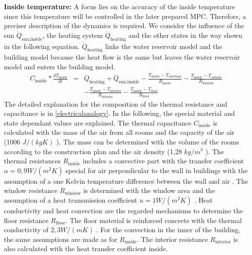     \textbf{Inside temperature:}\newline
    A focus lies on the accuracy of the inside temperature since this temperature will be controlled in the later prepared MPC. Therefore, a preciser description of the dynamics is required. We consider the influence of the sun $\dot{Q}_\text{sun,inside}$, the heating system $\dot{Q}_\text{heating}$ and the other states in the way shown in the following equation. $\dot{Q}_\text{heating}$  links the water reservoir model and the building model because the heat flow is the same but leaves the water reservoir model and enters the building model. 
    \begin{align}
        \label{eq:1.state}
        C_\text{inside}*\frac{d T_\text{inside}}{d t} &=& \dot{Q}_\text{heating} + \dot{Q}_\text{sun,inside} - \frac{T_\text{inside}-T_\text{envelope}}{R_\text{inside}} - \frac{T_\text{inside}-T_\text{outside}}{R_\text{window}} \\
       & &-\frac{T_\text{inside}-T_\text{interior}}{R_\text{interior}}-\frac{T_\text{inside}-T_\text{floor}}{R_\text{floor}}\nonumber
    \end{align}
    The detailed explanation for the composition of the thermal resistance and capacitance is in \autoref{electricalanalogy}. In the following, the special material and state dependant values are explained.
    The thermal capacitance $C_\text{inside}$ is calculated with the mass of the air from all rooms and the capacity of the air (1006 $J/(kg K)$ \cite{Weigand.2016}). The mass can be determined with the volume of the rooms according to the construction plan \cite{Bauplan} and the air density (1,28 $kg/m^3$ \cite{Weigand.2016}). 
    The thermal resistances $R_\text{inside}$ includes a convective part with the transfer coefficient $\alpha = 0,9 W/(m^2 K)$ special for air perpendicular to the wall in buildings with the assumption of a one Kelvin temperature difference between the wall and air \cite{Schweizer-fnalpha}.
    The window resistance $R_\text{window}$ is determined with the window area and the assumption of a heat transmission coefficient $u = 1 W/(m^2 K)$ \cite{ThorbenFrahm.2021}. 
    Heat conductivity and heat convection are the regarded mechanisms to determine the floor resistance $R_\text{floor}$. The floor material is reinforced concrete with the thermal conductivity of $2,3 W/(m K)$ \cite{AntonSchweizer.12.10.2021}. For the convection in the inner of the building, the same assumptions are made as for $R_\text{inside}$. 
    The interior resistance $R_\text{interior}$ is also calculated with the heat transfer coefficient inside.\newline 
    
